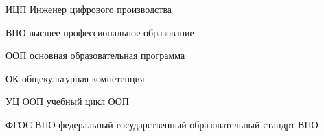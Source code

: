 
\begin{description}
\item{ИЦП} Инженер цифрового производства
\bigskip
\item{ВПО} высшее профессиональное образование
\item{ООП} основная образовательная программа
\item{ОК} общекультурная компетенция
\item{УЦ ООП} учебный цикл ООП
\item{ФГОС ВПО} федеральный государственный образовательный стандрт ВПО
\end{description}